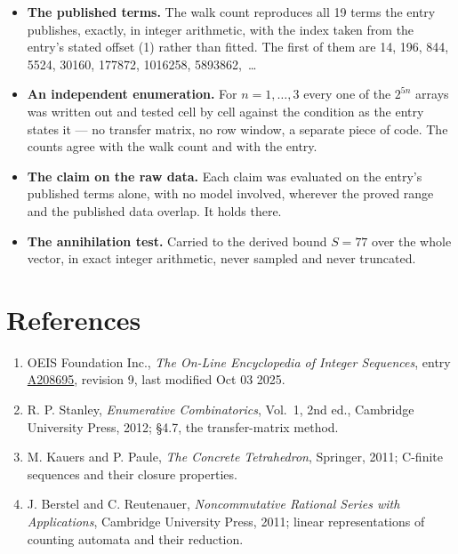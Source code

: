 \documentclass[11pt]{article}
\theoremstyle{definition}
\begin{document}
\begin{itemize}

\item {\bfseries The published terms.} The walk count reproduces all 19 terms the entry publishes, exactly, in integer arithmetic, with the index taken from the entry's stated offset (1) rather than fitted. The first of them are 14, 196, 844, 5524, 30160, 177872, 1016258, 5893862,~\dots

\item {\bfseries An independent enumeration.} For $n = 1,\dots,3$ every one of the $2^{5n}$ arrays was written out and tested cell by cell against the condition as the entry states it --- no transfer matrix, no row window, a separate piece of code. The counts agree with the walk count and with the entry.

\item {\bfseries The claim on the raw data.} Each claim was evaluated on the entry's published terms alone, with no model involved, wherever the proved range and the published data overlap. It holds there.

\item {\bfseries The annihilation test.} Carried to the derived bound $S = 77$ over the whole vector, in exact integer arithmetic, never sampled and never truncated.

\end{itemize}

\section{References}

\begin{enumerate}

\item OEIS Foundation Inc., \emph{The On-Line Encyclopedia of Integer Sequences}, entry \href{https://oeis.org/A208695}{A208695}, revision 9, last modified Oct 03 2025.

\item R. P. Stanley, \emph{Enumerative Combinatorics}, Vol.~1, 2nd ed., Cambridge University Press, 2012; \S4.7, the transfer-matrix method.

\item M. Kauers and P. Paule, \emph{The Concrete Tetrahedron}, Springer, 2011; C-finite sequences and their closure properties.

\item J. Berstel and C. Reutenauer, \emph{Noncommutative Rational Series with Applications}, Cambridge University Press, 2011; linear representations of counting automata and their reduction.

\end{enumerate}
\end{document}
